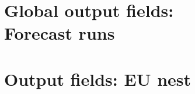 \documentclass[a4paper,twoside,10pt]{book}
\begin{document}






\chapter[Global output fields: Forecast runs]{Global output fields:\\ Forecast runs}





\chapter[Output fields: EU Nest]{Output fields: EU nest}








\begin{appendices}
\end{appendices}



\backmatter

\renewcommand{\chaptermark}[1] {
  \markboth{#1}{}
}

\renewcommand{\chaptermark}[1]{%
  \markboth{\chaptername
    \ \thechapter.\ #1}{}}
\end{document}
